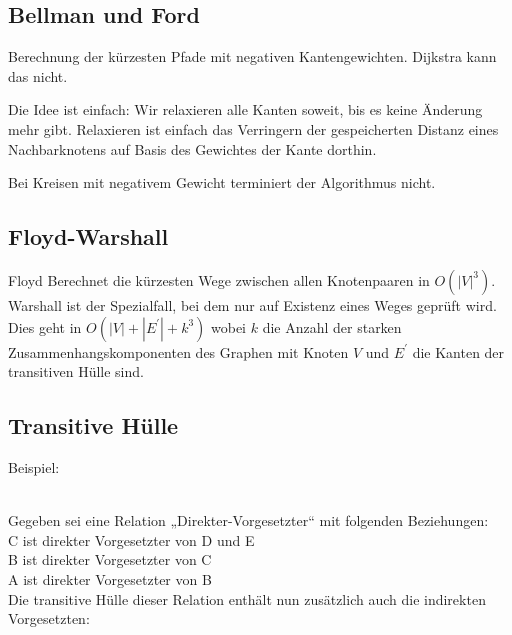 \documentclass[11pt]{scrartcl}
\begin{document}
\subsection{Bellman und Ford}

Berechnung der kürzesten Pfade mit negativen Kantengewichten. Dijkstra kann das nicht.

Die Idee ist einfach: Wir relaxieren alle Kanten soweit, bis es keine Änderung mehr gibt. Relaxieren ist einfach das Verringern der gespeicherten Distanz eines Nachbarknotens auf Basis des Gewichtes der Kante dorthin.

Bei Kreisen mit negativem Gewicht terminiert der Algorithmus nicht.

\subsection{Floyd-Warshall}

Floyd Berechnet die kürzesten Wege zwischen allen Knotenpaaren in $O(|V|^3)$. Warshall ist der Spezialfall, bei dem nur auf Existenz eines Weges geprüft wird. Dies geht in $O(|V| + |E^\prime| + k^3)$ wobei $k$ die Anzahl der starken Zusammenhangskomponenten des Graphen mit Knoten $V$ und $E^\prime$ die Kanten der transitiven Hülle sind.

\subsection{Transitive Hülle}

Beispiel: \\
\\
Gegeben sei eine Relation „Direkter-Vorgesetzter“ mit folgenden Beziehungen: \\

C ist direkter Vorgesetzter von D und E \\
B ist direkter Vorgesetzter von C \\
A ist direkter Vorgesetzter von B \\

Die transitive Hülle dieser Relation enthält nun zusätzlich auch die indirekten Vorgesetzten: \\
\end{document}
